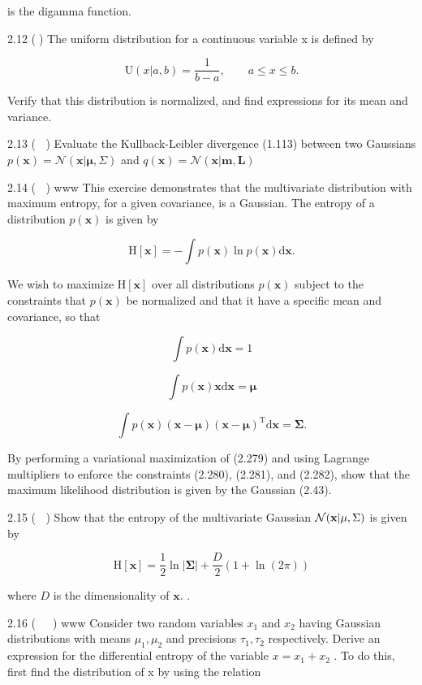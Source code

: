 \documentclass[
  10
]{article}
\begin{document}
is the digamma function.

2.12 () The uniform distribution for a continuous variable x is defined
by

\[
\mathrm{U} (x | a, b) = \frac {1}{b - a}, \qquad a \leqslant x \leqslant b.\tag{2.278}
\]

Verify that this distribution is normalized, and find expressions for
its mean and variance.

2.13 ( ) Evaluate the Kullback-Leibler divergence (1.113) between two
Gaussians
\(p ( \mathbf { x } ) = \mathcal { N } ( \mathbf { x } | \boldsymbol { \mu } , \Sigma )\)
and
\(q ( \mathbf { x } ) = \mathcal { N } ( \mathbf { x } | \mathbf { m } , \mathbf { L } )\)

2.14 ( ) www This exercise demonstrates that the multivariate
distribution with maximum entropy, for a given covariance, is a
Gaussian. The entropy of a distribution \(p ( \mathbf { x } )\) is given
by

\[
\mathrm{H} [ \mathbf {x} ] = - \int p (\mathbf {x}) \ln p (\mathbf {x}) \mathrm{d} \mathbf {x}.\tag{2.279}
\]

We wish to maximize \(\mathrm { H } [ \mathbf { x } ]\) over all
distributions \(p ( \mathbf { x } )\) subject to the constraints that
\(p ( \mathbf { x } )\) be normalized and that it have a specific mean
and covariance, so that

\[
\int p (\mathbf {x}) \mathrm{d} \mathbf {x} = 1\tag{2.280}
\]

\[
\int p (\mathbf {x}) \mathbf {x} \mathrm{d} \mathbf {x} = \pmb {\mu}\tag{2.281}
\]

\[
\int p (\mathbf {x}) (\mathbf {x} - \boldsymbol {\mu}) (\mathbf {x} - \boldsymbol {\mu}) ^ {\mathrm{T}} \mathrm{d} \mathbf {x} = \boldsymbol {\Sigma}.\tag{2.282}
\]

By performing a variational maximization of (2.279) and using Lagrange
multipliers to enforce the constraints (2.280), (2.281), and (2.282),
show that the maximum likelihood distribution is given by the Gaussian
(2.43).

2.15 ( ) Show that the entropy of the multivariate Gaussian
\(\mathcal { N } ( { \bf x } | \mu , \Sigma )\) is given by

\[
\mathrm{H} [ \mathbf {x} ] = \frac {1}{2} \ln | \pmb {\Sigma} | + \frac {D}{2} (1 + \ln (2 \pi))\tag{2.283}
\]

where \(D\) is the dimensionality of \(\mathbf { x } .\) .

2.16 (  ) www Consider two random variables \(x _ { 1 }\) and
\(x _ { 2 }\) having Gaussian distributions with means
\(\mu _ { 1 } , \mu _ { 2 }\) and precisions
\(\tau _ { 1 } , \tau _ { 2 }\) respectively. Derive an expression for
the differential entropy of the variable \(x = x _ { 1 } + x _ { 2 }\) .
To do this, first find the distribution of x by using the relation
\end{document}
